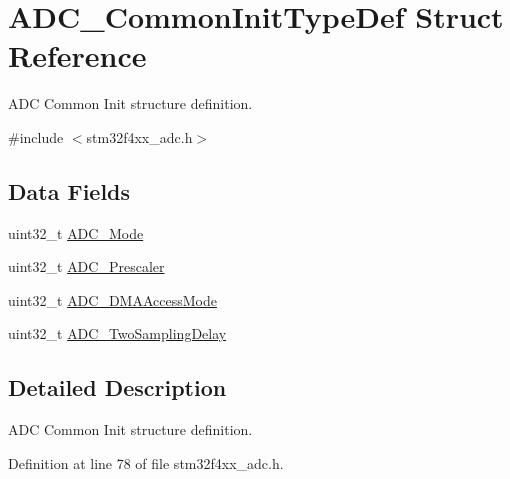 \hypertarget{struct_a_d_c___common_init_type_def}{\section{A\-D\-C\-\_\-\-Common\-Init\-Type\-Def Struct Reference}
\label{struct_a_d_c___common_init_type_def}
}


A\-D\-C Common Init structure definition.  




{\ttfamily \#include $<$stm32f4xx\-\_\-adc.\-h$>$}

\subsection*{Data Fields}
\begin{DoxyCompactItemize}
\item 
uint32\-\_\-t \hyperlink{struct_a_d_c___common_init_type_def_a7876bb5e90dfb86b6d3125f00dbc1c62}{A\-D\-C\-\_\-\-Mode}
\item 
uint32\-\_\-t \hyperlink{struct_a_d_c___common_init_type_def_af8239af49e67326025d674ff29eaf4a1}{A\-D\-C\-\_\-\-Prescaler}
\item 
uint32\-\_\-t \hyperlink{struct_a_d_c___common_init_type_def_a7a07e47276e023bd25354c0841090072}{A\-D\-C\-\_\-\-D\-M\-A\-Access\-Mode}
\item 
uint32\-\_\-t \hyperlink{struct_a_d_c___common_init_type_def_a27777b706ee9a544ffbac66eefcf952a}{A\-D\-C\-\_\-\-Two\-Sampling\-Delay}
\end{DoxyCompactItemize}


\subsection{Detailed Description}
A\-D\-C Common Init structure definition. 

Definition at line 78 of file stm32f4xx\-\_\-adc.\-h.




